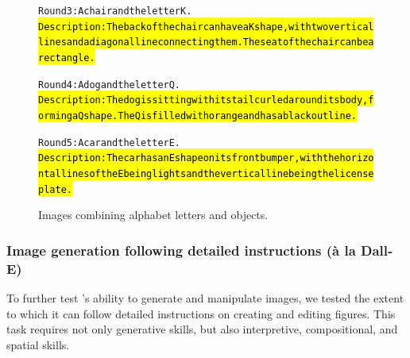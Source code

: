 \begin{figure}
\begin{AIbox}{\DV}
{\begin{alltt}
Round 3: A chair and the letter K. \\
\hl{Description: The back of the chair can have a K shape, with two vertical lines and a diagonal line connecting them. The seat of the chair can be a rectangle.}
\end{alltt}
}
%
\vspace{-10px} \tcbline \vspace{-20px}
\parbox[t]{0.8\textwidth}{
\begin{alltt}
Round 4: A dog and the letter Q. \\
\hl{Description: The dog is sitting with its tail curled around its body, forming a Q shape. The Q is filled with orange and has a black outline.}
\end{alltt}
}
%
\vspace{-10px} \tcbline \vspace{-20px}
\parbox[t]{0.8\textwidth}{
\begin{alltt}
Round 5: A car and the letter E. \\
\hl{Description: The car has an E shape on its front bumper, with the horizontal lines of the E being lights and the vertical line being the license plate.}
\end{alltt}
}
%
\vspace{-10px}
\end{AIbox}
	\caption{Images combining alphabet letters and objects.}
	\label{fig:alphabetfigure2}
\end{figure}

\subsubsection{Image generation following detailed instructions (\`a la Dall-E)}\label{sec:2d3d_example}
To further test \DV's ability to generate and manipulate images, we tested the extent to which it can follow detailed instructions on creating and editing figures. This task requires not only generative skills, but also interpretive, compositional, and spatial skills. 
\newline

